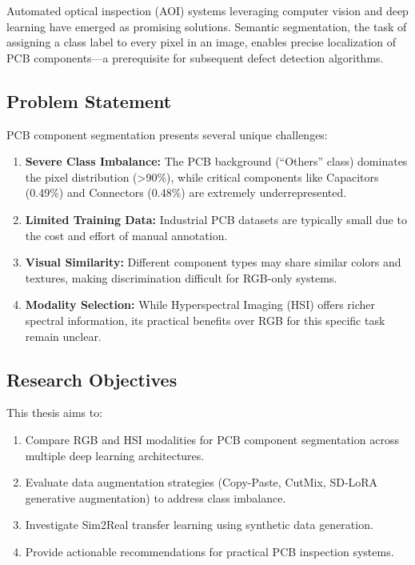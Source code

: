\documentclass[12pt,a4paper]{article}
\begin{document}
Automated optical inspection (AOI) systems leveraging computer vision and deep learning have emerged as promising solutions. Semantic segmentation, the task of assigning a class label to every pixel in an image, enables precise localization of PCB components—a prerequisite for subsequent defect detection algorithms.

\subsection{Problem Statement}

PCB component segmentation presents several unique challenges:

\begin{enumerate}
    \item \textbf{Severe Class Imbalance:} The PCB background (``Others'' class) dominates the pixel distribution (>90\%), while critical components like Capacitors (0.49\%) and Connectors (0.48\%) are extremely underrepresented.
    
    \item \textbf{Limited Training Data:} Industrial PCB datasets are typically small due to the cost and effort of manual annotation.
    
    \item \textbf{Visual Similarity:} Different component types may share similar colors and textures, making discrimination difficult for RGB-only systems.
    
    \item \textbf{Modality Selection:} While Hyperspectral Imaging (HSI) offers richer spectral information, its practical benefits over RGB for this specific task remain unclear.
\end{enumerate}

\subsection{Research Objectives}

This thesis aims to:
\begin{enumerate}
    \item Compare RGB and HSI modalities for PCB component segmentation across multiple deep learning architectures.
    \item Evaluate data augmentation strategies (Copy-Paste, CutMix, SD-LoRA generative augmentation) to address class imbalance.
    \item Investigate Sim2Real transfer learning using synthetic data generation.
    \item Provide actionable recommendations for practical PCB inspection systems.
\end{enumerate}
\end{document}
